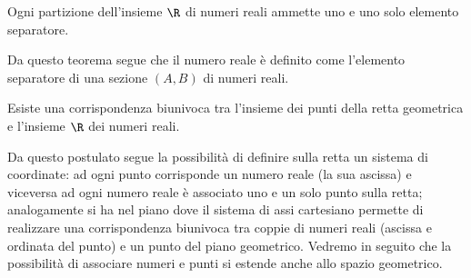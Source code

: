 \begin{teorema}[di Dedekind]
Ogni partizione dell'insieme \(\R\) di numeri reali ammette uno e uno solo 
elemento separatore.
\end{teorema}

Da questo teorema segue che il numero reale è definito come l'elemento 
separatore di una sezione \((A,B)\) di numeri reali.

\begin{postulato}
Esiste una corrispondenza biunivoca tra l'insieme dei punti della retta 
geometrica e l'insieme \(\R\) dei numeri reali.
\end{postulato}

Da questo postulato segue la possibilità di definire sulla retta un sistema di 
coordinate: ad ogni punto corrisponde un numero reale (la sua ascissa) e 
viceversa ad ogni numero reale è associato uno e un solo punto sulla retta; 
analogamente si ha nel piano dove il sistema di assi cartesiano permette di 
realizzare una corrispondenza biunivoca tra coppie di numeri reali (ascissa e 
ordinata del punto) e un punto del piano geometrico. Vedremo in seguito che la 
possibilità di associare numeri e punti si estende anche allo spazio geometrico.

% 

